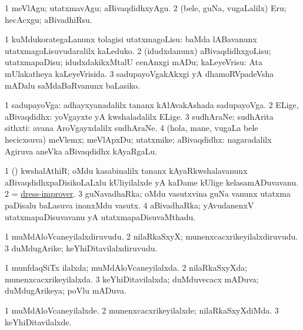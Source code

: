 \noindent
\gl{\akirx}
\bmng
\bnum
\num{1} meVlAgu; utatxmavAgu; aBivaqdidhxyAgu. 
\num{2} (bele, guNa, \mo vugaLalilx) Eru; hecAcxgu; aBivadhiRsu. 
\enum
\emng

\noindent
\gl{\nuga}
\bmng
\bnum
\num{1}  kuMdukorategaLanunx tolagisi utatxmagoLisu:  baMda lABavanunx utatxmagoLisuvudaralilx kaLeduko. 
\num{2}   (idudxdanunx) aBivaqdidhxgoLisu; utatxmapaDisu; idudxdakikxMtalU cenAnxgi mADu; kaLeyeVrisu:  Ata mUlakatheya kaLeyeVrisida. 
\num{3}  sadupayoVgakAkxgi yA dhamoRVpadeVsha mADalu saMdaBaRvanunx baLasiko. 
\enum
\emng
\eentry

\bentry
{}
\gl{\nA}
\bmng
\bnum
\num{1} sadupayoVga:  adhayxyanadalilx tananx kAlAvakAshada sadupayoVga. 
\num{2} ELige, aBivaqdidhx:  yoVgayxte yA kwshaladalilx ELige. 
\num{3} sudhAraNe; sudhArita sithxti:  avana AroVgayxdalilx sudhAraNe. 
\num{4} (hola, mane, \mo vugaLa bele hecicxsuva) meVlemx; meVlApxDu; utatxmike; aBivaqdidhx:  nagaradalilx Agiruva aneVka aBivaqdidhx kAyaRgaLu. 
\enum
\emng
\eentry

\bentry
{}
\gl{\nA}
\bmng
\bnum
\num{1} (\birx) kwshalAthiR; oMdu kasabinalilx tananx kAyaRkwshalavanunx aBivaqdidhxpaDisikoLaLxlu kUliyilalxde yA kaDame kUlige kelasamADuvavanu. 
\num{2} = \hyperref{kandict_d.pdf}{D}{dress-improver}{dress-improver}. 
\num{3} guNavadhaRka; oMdu vasutxvina guNa \mo vanunx utatxma paDisalu baLasuva inonxMdu vasutx. 
\num{4} aBivadhaRka; yAvudanenxV utatxmapaDisuvavanu yA utatxmapaDisuvaMthadu. 
\enum
\emng
\eentry

\bentry
{}
\gl{\nA}
\bmng
\bnum
\num{1} muMdAloVcaneyilalxdiruvudu. 
\num{2} nilaRkaSxyX; munenxcacxrikeyilalxdiruvudu. 
\num{3} duMdugArike; keYhiDitavilalxdiruvudu. 
\enum
\emng
\eentry

\bentry
{}
\gl{\gu}
\bmng
\bnum
\num{1} munfdaqSiTx ilalxda; muMdAloVcaneyilalxda. 
\num{2} nilaRkaSxyXda; munenxcacxrikeyilalxda. 
\num{3} keYhiDitavilalxda; duMduvecacx mADuva; duMdugArikeya; poVlu mADuva. 
\enum
\emng
\eentry

\bentry
{}
\gl{\kirxvi}
\bmng
\bnum
\num{1} muMdAloVcaneyilalxde. 
\num{2} munenxcacxrikeyilalxde; nilaRkaSxyXdiMda. 
\num{3} keYhiDitavilalxde. 
\enum
\emng
\eentry

